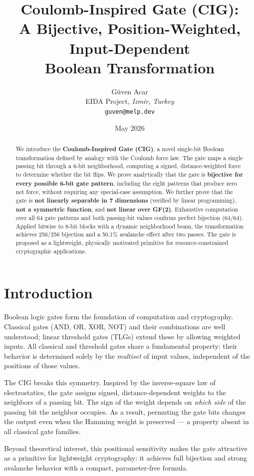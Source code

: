 \documentclass[10pt,a4paper]{article}
\title{\textbf{Coulomb-Inspired Gate (CIG):}\\
A Bijective, Position-Weighted, Input-Dependent\\
Boolean Transformation}
\author{G\"{u}ven Acar\\
\small EIDA Project, \textit{Izmir, Turkey}\\
\small \texttt{guven@melp.dev}}
\date{May 2026}
\begin{document}
\maketitle

\begin{abstract}
We introduce the \textbf{Coulomb-Inspired Gate (CIG)}, a novel single-bit Boolean transformation
defined by analogy with the Coulomb force law. The gate maps a single passing bit
through a 6-bit neighborhood, computing a signed, distance-weighted force to determine
whether the bit flips. We prove analytically that the gate is \textbf{bijective for
every possible 6-bit gate pattern}, including the eight patterns that produce zero net
force, without requiring any special-case assumption. We further prove that the gate
is \textbf{not linearly separable in 7 dimensions} (verified by linear programming),
\textbf{not a symmetric function}, and \textbf{not linear over GF(2)}.
Exhaustive computation over all 64 gate patterns and both passing-bit values confirms
perfect bijection (64/64). Applied bitwise to 8-bit blocks with a dynamic neighborhood
beam, the transformation achieves 256/256 bijection and a 50.1\% avalanche effect
after two passes. The gate is proposed as a lightweight, physically motivated primitive
for resource-constrained cryptographic applications.
\end{abstract}

\section{Introduction}

Boolean logic gates form the foundation of computation and cryptography.
Classical gates (AND, OR, XOR, NOT) and their combinations are well understood;
linear threshold gates (TLGs) extend these by allowing weighted inputs.
All classical and threshold gates share a fundamental property: their behavior
is determined solely by the \emph{multiset} of input values, independent of
the positions of those values.

The CIG breaks this symmetry. Inspired by the inverse-square law
of electrostatics, the gate assigns signed, distance-dependent weights to the
neighbors of a passing bit. The sign of the weight depends on \emph{which side}
of the passing bit the neighbor occupies. As a result, permuting the gate bits
changes the output even when the Hamming weight is preserved --- a property
absent in all classical gate families.

Beyond theoretical interest, this positional sensitivity makes the gate attractive
as a primitive for lightweight cryptography: it achieves full bijection and strong
avalanche behavior with a compact, parameter-free formula.
\end{document}

